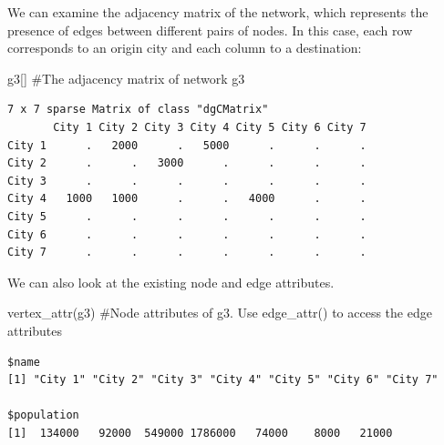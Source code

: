 \documentclass[
  letterpaper,
  DIV=11,
  numbers=noendperiod]{scrreprt}
\newenvironment{Shaded}{\begin{snugshade}}{\end{snugshade}}
\newcommand{\CommentTok}[1]{\textcolor[rgb]{0.37,0.37,0.37}{#1}}
\newcommand{\DecValTok}[1]{\textcolor[rgb]{0.68,0.00,0.00}{#1}}
\newcommand{\FunctionTok}[1]{\textcolor[rgb]{0.28,0.35,0.67}{#1}}
\newcommand{\NormalTok}[1]{\textcolor[rgb]{0.00,0.23,0.31}{#1}}
\newcommand{\OtherTok}[1]{\textcolor[rgb]{0.00,0.23,0.31}{#1}}
\newcommand{\SpecialCharTok}[1]{\textcolor[rgb]{0.37,0.37,0.37}{#1}}
\begin{document}
\begin{Shaded}
\end{Shaded}

We can examine the adjacency matrix of the network, which represents the
presence of edges between different pairs of nodes. In this case, each
row corresponds to an origin city and each column to a destination:

\begin{Shaded}
\begin{Highlighting}[]
\NormalTok{g3[] }\CommentTok{\#The adjacency matrix of network g3}
\end{Highlighting}
\end{Shaded}

\begin{verbatim}
7 x 7 sparse Matrix of class "dgCMatrix"
       City 1 City 2 City 3 City 4 City 5 City 6 City 7
City 1      .   2000      .   5000      .      .      .
City 2      .      .   3000      .      .      .      .
City 3      .      .      .      .      .      .      .
City 4   1000   1000      .      .   4000      .      .
City 5      .      .      .      .      .      .      .
City 6      .      .      .      .      .      .      .
City 7      .      .      .      .      .      .      .
\end{verbatim}

We can also look at the existing node and edge attributes.

\begin{Shaded}
\begin{Highlighting}[]
\FunctionTok{vertex\_attr}\NormalTok{(g3) }\CommentTok{\#Node attributes of g3. Use edge\_attr() to access the edge attributes}
\end{Highlighting}
\end{Shaded}

\begin{verbatim}
$name
[1] "City 1" "City 2" "City 3" "City 4" "City 5" "City 6" "City 7"

$population
[1]  134000   92000  549000 1786000   74000    8000   21000
\end{verbatim}
\end{document}
